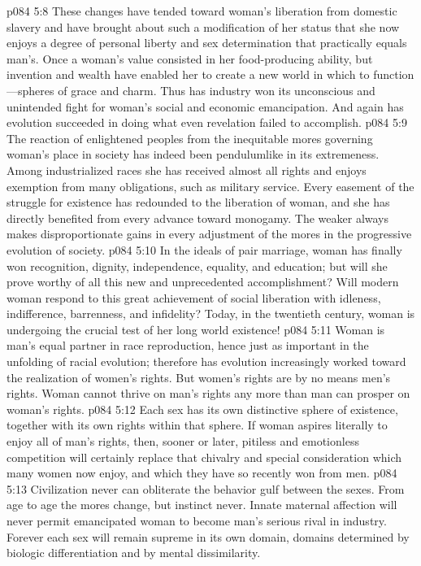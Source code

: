 \vs p084 5:8 These changes have tended toward woman’s liberation from domestic slavery and have brought about such a modification of her status that she now enjoys a degree of personal liberty and sex determination that practically equals man’s. Once a woman’s value consisted in her food\hyp{}producing ability, but invention and wealth have enabled her to create a new world in which to function---spheres of grace and charm. Thus has industry won its unconscious and unintended fight for woman’s social and economic emancipation. And again has evolution succeeded in doing what even revelation failed to accomplish.
\pc \vs p084 5:9 The reaction of enlightened peoples from the inequitable mores governing woman’s place in society has indeed been pendulumlike in its extremeness. Among industrialized races she has received almost all rights and enjoys exemption from many obligations, such as military service. Every easement of the struggle for existence has redounded to the liberation of woman, and she has directly benefited from every advance toward monogamy. The weaker always makes disproportionate gains in every adjustment of the mores in the progressive evolution of society.
\vs p084 5:10 In the ideals of pair marriage, woman has finally won recognition, dignity, independence, equality, and education; but will she prove worthy of all this new and unprecedented accomplishment? Will modern woman respond to this great achievement of social liberation with idleness, indifference, barrenness, and infidelity? Today, in the twentieth century, woman is undergoing the crucial test of her long world existence!
\vs p084 5:11 Woman is man’s equal partner in race reproduction, hence just as important in the unfolding of racial evolution; therefore has evolution increasingly worked toward the realization of women’s rights. But women’s rights are by no means men’s rights. Woman cannot thrive on man’s rights any more than man can prosper on woman’s rights.
\vs p084 5:12 Each sex has its own distinctive sphere of existence, together with its own rights within that sphere. If woman aspires literally to enjoy all of man’s rights, then, sooner or later, pitiless and emotionless competition will certainly replace that chivalry and special consideration which many women now enjoy, and which they have so recently won from men.
\vs p084 5:13 Civilization never can obliterate the behavior gulf between the sexes. From age to age the mores change, but instinct never. Innate maternal affection will never permit emancipated woman to become man’s serious rival in industry. Forever each sex will remain supreme in its own domain, domains determined by biologic differentiation and by mental dissimilarity.\plusone
